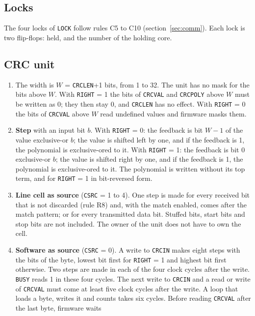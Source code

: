 \documentclass[10pt,a4paper]{article}
\newcommand{\reg}[1]{\texttt{#1}}
\begin{document}
\subsection{Locks}

The four locks of \reg{LOCK} follow rules C5 to C10 (section~\ref{sec:comm}). Each lock is two flip-flops: held,
and the number of the holding core.

\subsection{CRC unit}

\begin{enumerate}[label=\textbf{F\arabic*},leftmargin=2.6em]
\item The width is $W$ = \reg{CRCLEN}+1 bits, from 1 to 32. The unit has no mask for the bits above $W$.
With \reg{RIGHT} = 1 the bits of \reg{CRCVAL} and \reg{CRCPOLY} above $W$ must be written as 0; they then
stay 0, and \reg{CRCLEN} has no effect. With \reg{RIGHT} = 0 the bits of \reg{CRCVAL} above $W$ read
undefined values and firmware masks them.
\item \textbf{Step} with an input bit $b$. With \reg{RIGHT} = 0: the feedback is bit $W-1$ of the value
exclusive-or $b$; the value is shifted left by one, and if the feedback is 1, the polynomial is exclusive-ored
to it. With \reg{RIGHT} = 1: the feedback is bit 0 exclusive-or $b$; the value is shifted right by one, and if
the feedback is 1, the polynomial is exclusive-ored to it. The polynomial is written without its top term, and
for \reg{RIGHT} = 1 in bit-reversed form.
\item \textbf{Line cell as source} (\reg{CSRC} = 1 to 4). One step is made for every received bit that is not
discarded (rule R8) and, with the match enabled, comes after the match pattern; or for every transmitted data bit. Stuffed bits, start bits and stop bits are not
included. The owner of the unit does not have to own the cell.
\item \textbf{Software as source} (\reg{CSRC} = 0). A write to \reg{CRCIN} makes eight steps with the bits of the
byte, lowest bit first for \reg{RIGHT} = 1 and highest bit first otherwise. Two steps are made in each of the
four clock cycles after the write. \reg{BUSY} reads 1 in these four cycles. The next write to \reg{CRCIN} and
a read or write of \reg{CRCVAL} must come at least five clock cycles after the write. A loop that loads a
byte, writes it and counts takes six cycles. Before reading \reg{CRCVAL} after the last byte, firmware waits

\end{enumerate}
\end{document}
